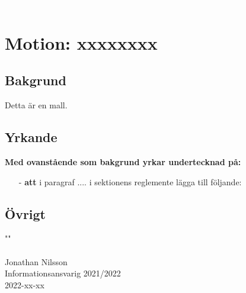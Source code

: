 \textcolor{white}{.} %



\section*{Motion: xxxxxxxx}
\subsection*{Bakgrund}
Detta är en mall. 
\subsection*{Yrkande}
\textbf{Med ovanstående som bakgrund yrkar undertecknad på:}
\begin{itemize}
    \item[-] \textbf{att} i paragraf .... i sektionens reglemente lägga till följande:
    
\end{itemize} 




\subsection*{Övrigt}
""\\


\noindent \makebox[2.5in]{\hrulefill} \\
\noindent Jonathan Nilsson\\
Informationsansvarig 2021/2022\\
2022-xx-xx
